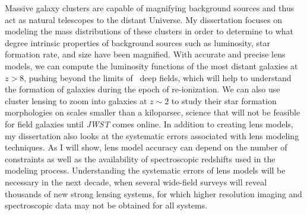 Massive galaxy clusters are capable of magnifying background sources and thus act as natural telescopes to the distant Universe. My dissertation focuses on modeling the mass distributions of these clusters in order to determine to what degree intrinsic properties of background sources such as luminosity, star formation rate, and size have been magnified. With accurate and precise lens models, we can compute the luminosity functions of the most distant galaxies at $z>8$, pushing beyond the limits of \hst\ deep fields, which will help to understand the formation of galaxies during the epoch of re-ionization. We can also use cluster lensing to zoom into galaxies at $z\sim2$ to study their star formation morphologies on scales smaller than a kiloparsec, science that will not be feasible for field galaxies until {\it JWST} comes online. In addition to creating lens models, my dissertation also looks at the systematic errors associated with lens modeling techniques. As I will show, lens model accuracy can depend on the number of constraints as well as the availability of spectroscopic redshifts used in the modeling process. Understanding the systematic errors of lens models will be necessary in the next decade, when several wide-field surveys will reveal thousands of new strong lensing systems, for which higher resolution imaging and spectroscopic data may not be obtained for all systems.